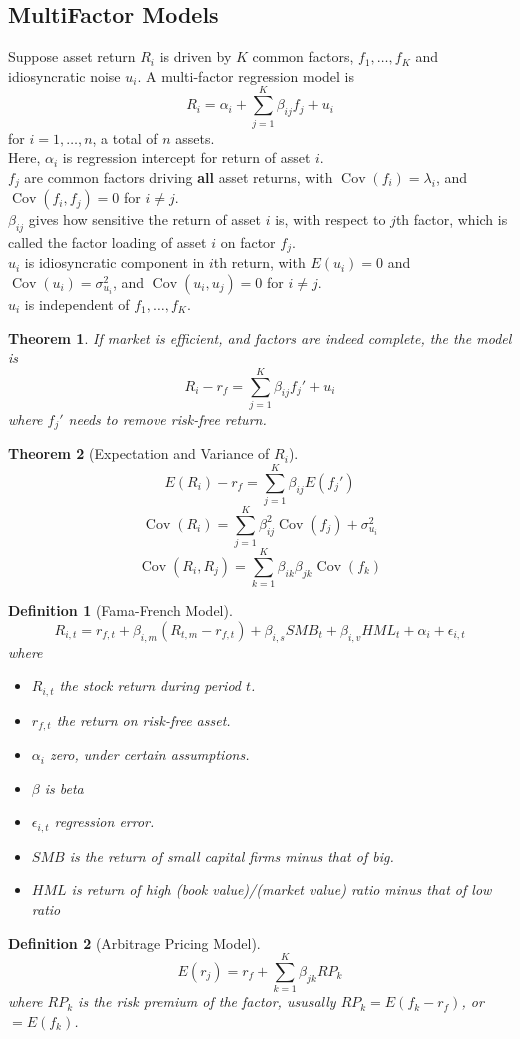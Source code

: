 \documentclass[12pt]{article}
\newtheorem{definition}{Definition}[section]
\newtheorem{theorem}{Theorem}[section]
\theoremstyle{definition}
\DeclareMathOperator{\cov}{Cov}
\begin{document}
\subsection{MultiFactor Models}
Suppose asset return $R_i$ is driven by $K$ common factors, $f_1, \ldots, f_K$ and idiosyncratic noise $u_i$. A multi-factor regression model is
\[
R_i = \alpha_i + \sum_{j=1}^K \beta_{ij}f_j + u_i
\]
for $i = 1, \ldots, n$, a total of $n$ assets.\\
Here, $\alpha_i$ is regression intercept for return of asset $i$.\\
$f_j$ are common factors driving \textbf{all} asset returns, with $\cov(f_i)=\lambda_i$, and $\cov(f_i, f_j)=0$ for $i\neq j$.\\
$\beta_{ij}$ gives how sensitive the return of asset $i$ is, with respect to $j$th factor, which is called the factor loading of asset $i$ on factor $f_j$.\\
$u_i$ is idiosyncratic component in $i$th return, with $E(u_i)=0$ and $\cov(u_i)=\sigma_{u_i}^2$, and $\cov(u_i,u_j)=0$ for $i\neq j$.\\
$u_i$ is independent of $f_1, \ldots, f_K$.\\
\begin{theorem}\normalfont If market is efficient, and factors are indeed complete, the the model is
\[
R_i-r_f = \sum_{j=1}^K \beta_{ij}f_{j}' + u_i
\]
where $f_j'$ needs to remove risk-free return.\end{theorem}
\begin{theorem}[Expectation and Variance of {$R_i$}]
\hfill\\\normalfont 
\[
E(R_i)-r_f = \sum_{j=1}^K \beta_{ij}E(f_j')
\]
\[
\cov(R_i) = \sum_{j=1}^K \beta_{ij}^2\cov(f_j) + \sigma_{u_i}^2
\]
\[
\cov(R_i, R_j) = \sum_{k=1}^K \beta_{ik}\beta_{jk}\cov(f_k)
\]
\end{theorem}
\begin{definition}[Fama-French Model]
\hfill\\\normalfont 
\[
R_{i,t} = r_{f,t} + \beta_{i,m}(R_{t,m}-r_{f,t})+\beta_{i,s}SMB_t + \beta_{i,v}HML_t + \alpha_i + \epsilon_{i,t}
\]
where
\begin{itemize}
  \item $R_{i,t}$ the stock return during period $t$.
  \item $r_{f,t}$ the return on risk-free asset.
  \item $\alpha_i$ zero, under certain assumptions.
  \item $\beta$ is beta
  \item $\epsilon_{i,t}$ regression error.
  \item $SMB$ is the return of small capital firms minus that of big.
  \item $HML$ is return of high (book value)/(market value) ratio minus that of low ratio
\end{itemize}
\end{definition}
\begin{definition}[Arbitrage Pricing Model]
\hfill\\\normalfont
\[
E(r_j) = r_f + \sum_{k=1}^K \beta_{jk}RP_k
\]
where $RP_k$ is the risk premium of the factor, ususally $RP_k=E(f_k-r_f)$, or $=E(f_k)$.
\end{definition}
\end{document}
